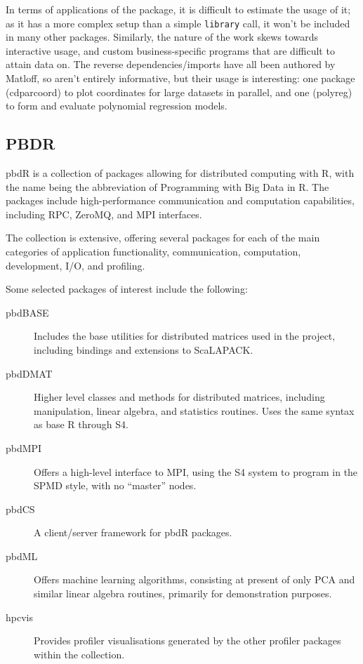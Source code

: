 \documentclass[10pt,a4paper]{article}
\begin{document}
In terms of applications of the package, it is difficult to estimate
the usage of it; as it has a more complex setup than a simple
\texttt{library} call, it won't be included in many other packages.
Similarly, the nature of the work skews towards interactive usage, and
custom business-specific programs that are difficult to attain data
on. The reverse dependencies/imports have all been authored by
Matloff, so aren't entirely informative, but their usage is
interesting: one package (cdparcoord) to plot coordinates for large
datasets in parallel, and one (polyreg) to form and evaluate
polynomial regression models.

\subsection{PBDR}
\label{sec:pbdr}


pbdR is a collection of packages allowing for distributed computing
with R\cite{pbdBASEpackage}, with the name being the abbreviation of
Programming with Big Data in R. The packages include high-performance
communication and computation capabilities, including RPC, ZeroMQ, and
MPI interfaces.

The collection is extensive, offering several packages for each of the
main categories of application functionality, communication,
computation, development, I/O, and profiling.

Some selected packages of interest include the following:

\begin{description}
\item[pbdBASE] Includes the base utilities for distributed matrices
  used in the project, including bindings and extensions to ScaLAPACK\cite{pbdBASEpackage}.
\item[pbdDMAT] Higher level classes and methods for distributed
  matrices, including manipulation, linear algebra, and statistics
  routines. Uses the same syntax as base R through S4\cite{pbdDMATpackage}.
\item[pbdMPI] Offers a high-level interface to MPI, using the S4
  system to program in the SPMD style, with no ``master'' nodes\cite{Chen2012pbdMPIpackage}.
\item[pbdCS] A client/server framework for pbdR packages\cite{Schmidt2015pbdCSpackage}. 
\item[pbdML] Offers machine learning algorithms, consisting at present
  of only PCA and similar linear algebra routines, primarily for
  demonstration purposes\cite{schmidt20}.
\item[hpcvis] Provides profiler visualisations generated by the other
  profiler packages within the collection\cite{hpcvis}.
\end{description}
\end{document}
